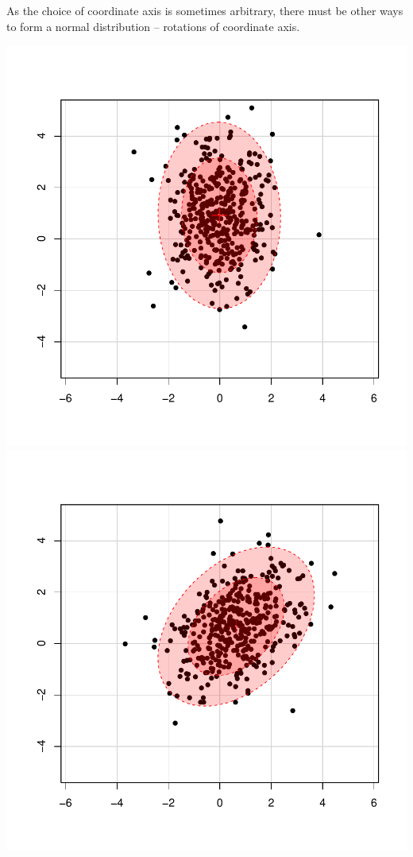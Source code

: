 \documentclass[landscape,footrule]{foils}
\begin{document}

As the choice of coordinate axis is sometimes arbitrary, there must be other ways to form a normal distribution -- rotations of coordinate axis.\vspace*{-1cm}  

\begin{center}
\includegraphics[scale=0.65]{two-dimensional-normal-distribution-i.pdf}
\includegraphics[scale=0.65]{two-dimensional-normal-distribution-ii.pdf}
\end{center}\vspace*{-1cm}
\end{document}

